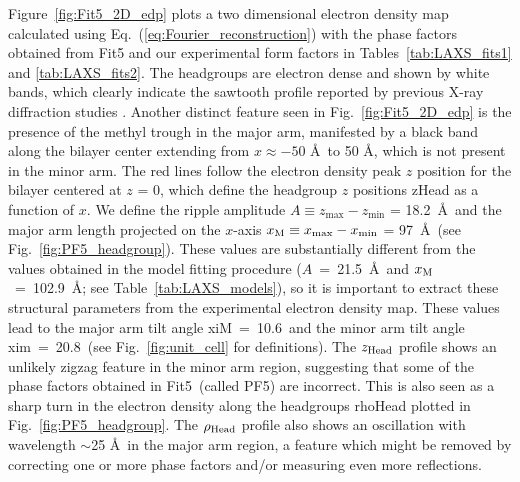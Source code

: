 Figure~\ref{fig:Fit5_2D_edp} plots a two dimensional electron density map calculated
using Eq.~(\ref{eq:Fourier_reconstruction})
with the phase factors obtained from Fit5  
and our experimental form factors in Tables~\ref{tab:LAXS_fits1} and \ref{tab:LAXS_fits2}.
The headgroups are electron dense and shown by white bands, which clearly indicate
the sawtooth profile reported by
previous X-ray diffraction studies \cite{ref:Sun96,ref:Sengupta03,ref:Pabst04}.
Another distinct feature seen in Fig.~\ref{fig:Fit5_2D_edp} is the 
presence of the methyl trough in the major arm, 
manifested by a black band along the bilayer center extending from 
$x \approx -50$ \AA\ to 50 \AA, which is not present in the minor arm.
The red lines follow the electron density peak $z$ position for the bilayer
centered at $z$ = 0, which define the headgroup $z$ positions \gls{zHead} as a function of $x$.
We define the ripple amplitude $A \equiv z_\text{max}-z_\text{min}$ = 18.2~\AA\ 
and the major arm length projected on the $x$-axis 
$x_\textrm{M} \equiv x_\text{max}-x_\text{min}$ = 97~\AA\
(see Fig.~\ref{fig:PF5_headgroup}).
These values are substantially different from the values obtained in the model fitting 
procedure ($A$~=~21.5~\AA\ and $x_\textrm{M}$~=~102.9~\AA; see Table~\ref{tab:LAXS_models}), 
so it is important to extract these structural parameters from the 
experimental electron density map. 
These values lead to the major arm tilt angle \gls{xiM}~=~10.6\textdegree\ and 
the minor arm tilt angle \gls{xim}~=~20.8\textdegree\
(see Fig.~\ref{fig:unit_cell} for definitions).
The $z_\text{Head}$ profile shows an unlikely zigzag feature in the minor arm region,
suggesting that some of the phase factors obtained in Fit5~(called PF5) are 
incorrect. This is also seen as a sharp turn in the electron density along the 
headgroups \gls{rhoHead} plotted in Fig.~\ref{fig:PF5_headgroup}. 
The $\rho_\text{Head}$ profile also shows an oscillation with wavelength $\sim$25 \AA\
in the major arm region,
a feature which might be removed by correcting one or more phase factors and/or
measuring even more reflections.

